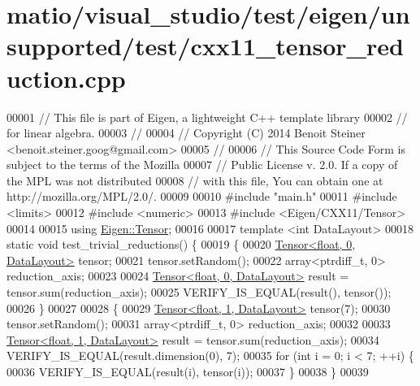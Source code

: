 \hypertarget{matio_2visual__studio_2test_2eigen_2unsupported_2test_2cxx11__tensor__reduction_8cpp_source}{}\section{matio/visual\+\_\+studio/test/eigen/unsupported/test/cxx11\+\_\+tensor\+\_\+reduction.cpp}
\label{matio_2visual__studio_2test_2eigen_2unsupported_2test_2cxx11__tensor__reduction_8cpp_source}

\begin{DoxyCode}
00001 \textcolor{comment}{// This file is part of Eigen, a lightweight C++ template library}
00002 \textcolor{comment}{// for linear algebra.}
00003 \textcolor{comment}{//}
00004 \textcolor{comment}{// Copyright (C) 2014 Benoit Steiner <benoit.steiner.goog@gmail.com>}
00005 \textcolor{comment}{//}
00006 \textcolor{comment}{// This Source Code Form is subject to the terms of the Mozilla}
00007 \textcolor{comment}{// Public License v. 2.0. If a copy of the MPL was not distributed}
00008 \textcolor{comment}{// with this file, You can obtain one at http://mozilla.org/MPL/2.0/.}
00009 
00010 \textcolor{preprocessor}{#include "main.h"}
00011 \textcolor{preprocessor}{#include <limits>}
00012 \textcolor{preprocessor}{#include <numeric>}
00013 \textcolor{preprocessor}{#include <Eigen/CXX11/Tensor>}
00014 
00015 \textcolor{keyword}{using} \hyperlink{class_eigen_1_1_tensor}{Eigen::Tensor};
00016 
00017 \textcolor{keyword}{template} <\textcolor{keywordtype}{int} DataLayout>
00018 \textcolor{keyword}{static} \textcolor{keywordtype}{void} test\_trivial\_reductions() \{
00019   \{
00020     \hyperlink{class_eigen_1_1_tensor}{Tensor<float, 0, DataLayout>} tensor;
00021     tensor.setRandom();
00022     array<ptrdiff\_t, 0> reduction\_axis;
00023 
00024     \hyperlink{class_eigen_1_1_tensor}{Tensor<float, 0, DataLayout>} result = tensor.sum(reduction\_axis);
00025     VERIFY\_IS\_EQUAL(result(), tensor());
00026   \}
00027 
00028   \{
00029     \hyperlink{class_eigen_1_1_tensor}{Tensor<float, 1, DataLayout>} tensor(7);
00030     tensor.setRandom();
00031     array<ptrdiff\_t, 0> reduction\_axis;
00032 
00033     \hyperlink{class_eigen_1_1_tensor}{Tensor<float, 1, DataLayout>} result = tensor.sum(reduction\_axis);
00034     VERIFY\_IS\_EQUAL(result.dimension(0), 7);
00035     \textcolor{keywordflow}{for} (\textcolor{keywordtype}{int} i = 0; i < 7; ++i) \{
00036       VERIFY\_IS\_EQUAL(result(i), tensor(i));
00037     \}
00038   \}
00039 

\end{DoxyCode}
